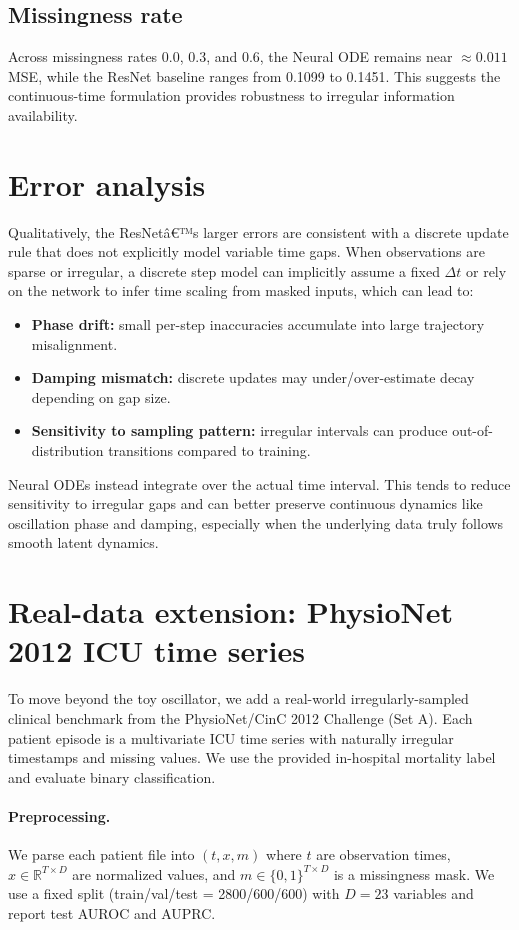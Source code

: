﻿\documentclass[10pt]{article}
\begin{document}
\subsection{Missingness rate}
Across missingness rates 0.0, 0.3, and 0.6, the Neural ODE remains near $\approx 0.011$ MSE, while the ResNet baseline ranges from 0.1099 to 0.1451. This suggests the continuous-time formulation provides robustness to irregular information availability.

\section{Error analysis}
Qualitatively, the ResNetâ€™s larger errors are consistent with a discrete update rule that does not explicitly model variable time gaps. When observations are sparse or irregular, a discrete step model can implicitly assume a fixed $\Delta t$ or rely on the network to infer time scaling from masked inputs, which can lead to:
\begin{itemize}
  \item \textbf{Phase drift:} small per-step inaccuracies accumulate into large trajectory misalignment.
  \item \textbf{Damping mismatch:} discrete updates may under/over-estimate decay depending on gap size.
  \item \textbf{Sensitivity to sampling pattern:} irregular intervals can produce out-of-distribution transitions compared to training.
\end{itemize}

Neural ODEs instead integrate over the actual time interval. This tends to reduce sensitivity to irregular gaps and can better preserve continuous dynamics like oscillation phase and damping, especially when the underlying data truly follows smooth latent dynamics.

\section{Real-data extension: PhysioNet 2012 ICU time series}
To move beyond the toy oscillator, we add a real-world irregularly-sampled clinical benchmark from the PhysioNet/CinC 2012 Challenge (Set A). Each patient episode is a multivariate ICU time series with naturally irregular timestamps and missing values. We use the provided in-hospital mortality label and evaluate binary classification.

\paragraph{Preprocessing.}
We parse each patient file into $(t, x, m)$ where $t$ are observation times, $x \in \mathbb{R}^{T \times D}$ are normalized values, and $m \in \{0,1\}^{T \times D}$ is a missingness mask. We use a fixed split (train/val/test = 2800/600/600) with $D=23$ variables and report test AUROC and AUPRC.
\end{document}
